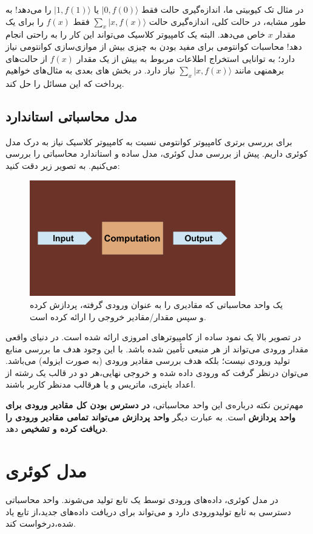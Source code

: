 \documentclass{book}
\begin{document}
در مثال تک کیوبیتی ما، اندازه‌گیری حالت فقط $\vert 0, f(0)\rangle$ یا $\vert 1, f(1)\rangle$ را می‌دهد! به طور مشابه، در حالت کلی، اندازه‌گیری حالت $\sum_{x} \vert x, f(x) \rangle$ فقط $ f (x)$ را برای یک مقدار $x$ خاص می‌دهد. البته یک کامپیوتر کلاسیک می‌تواند این کار را به راحتی انجام دهد! محاسبات کوانتومی برای مفید بودن به چیزی بیش از موازی‌سازی کوانتومی نیاز دارد؛ به توانایی استخراج اطلاعات مربوط به بیش از یک مقدار $f (x)$ از حالت‌های برهمنهی مانند $\sum _{x}\vert x, f(x) \rangle$ نیاز دارد. 
در بخش های بعدی به مثال‌های خواهیم پرداخت که این مسائل را حل کند.
\subsection{مدل محاسباتی استاندارد}
برای بررسی برتری کامپیوتر کوانتومی نسبت به کامپیوتر کلاسیک نیاز به درک مدل کوئری داریم. پیش از بررسی مدل کوئری،‌ مدل ساده و استاندارد محاسباتی را بررسی می‌کنیم. به تصویر زیر دقت کنید:

\begin{figure}[ht]
	\centering
	\includegraphics[width=0.8\textwidth]{standard computation model.png}
	\caption{یک واحد محاسباتی که مقادیری را به عنوان ورودی گرفته، پردازش کرده و سپس مقدار/مقادیر خروجی را ارائه کرده است.}
\end{figure}


در تصویر بالا یک نمود ساده از کامپیوتر‌های امروزی ارائه شده است. در دنیای واقعی مقدار ورودی می‌تواند از هر منبعی‌ تأمین شده باشد. با این وجود هدف ما بررسی منابع تولید ورودی نیست؛‌ بلکه هدف بررسی مقادیر ورودی (به صورت ایزوله) می‌باشد. می‌توان درنظر گرفت که ورودی داده شده و خروجی نهایی،‌هر دو در قالب یک رشته از اعداد باینری، ماتریس و یا هرقالب مدنظر کاربر باشند.

مهم‌ترین نکته درباره‌ی این واحد محاسباتی،‌ \textbf{در دسترس بودن کل مقادیر ورودی برای واحد پردازش} است. به عبارت دیگر\textbf{ واحد پردازش می‌تواند تمامی مقادیر ورودی را دریافت کرده و تشخیص} دهد. 

\section{مدل کوئری}
در مدل کوئری، داده‌های ورودی توسط یک تابع تولید می‌شوند. واحد محاسباتی دسترسی به تابع تولیدورودی دارد و می‌تواند برای دریافت داده‌های جدید،‌از تابع یاد شده،‌درخواست کند.
\end{document}
